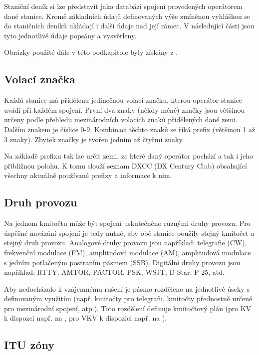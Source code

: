 Staniční deník si lze představit jako databázi spojení provedených operátorem dané stanice.
Kromě základních údajů definovaných výše zmíněnou vyhláškou se do staničních deníků ukládají i další údaje
nad její rámec. V následující části jsou tyto jednotlivé údaje popsány a vysvětleny.

Obrázky použité dále v této podkapitole byly získány z \cite{mapability}.

\subsection{Volací značka}

Každá stanice má přidělenu jedinečnou volací značku, kterou operátor stanice uvádí při každém spojení.
První dva znaky (někdy méně) značky jsou většinou určeny podle přehledu mezinárodních volacích znaků
přidělených dané zemi.
Dalším znakem je číslice 0-9. Kombinaci těchto znaků se říká prefix (většinou 1 až
3 znaky). Zbytek značky je tvořen jedním až čtyřmi znaky.

Na základě prefixu tak lze určit zemi, ze které daný operátor pochází a tak i
jeho přibližnou polohu. K tomu slouží seznam DXCC (DX Century Club) \cite{dxcc} %
obsahující všechny aktuálně používané prefixy a informace k nim.

\subsection{Druh provozu}

Na jednom kmitočtu může být spojení uskutečněno různými druhy provozu. Pro
úspěšné navázání spojení je tedy nutné, aby obě stanice použily stejný kmitočet
a stejný druh provozu. Analogové druhy provozu jsou například: telegrafie (CW), frekvenční modulace (FM), amplitudová modulace (AM),
amplitudová modulace s jedním potlačeným postraním pásmem (SSB). Digitální druhy provozu jsou například: RTTY, AMTOR, PACTOR, PSK, WSJT, D-Star, P-25, atd.

Aby nedocházalo k vzájemnému rušení je pásmo rozděleno na jednotlivé úseky s
definovaným využitím (např. kmitočty pro telegrafii, kmitočty přednostně určené
pro mezinárodní spojení, atp.). Toto rozdělení definuje kmitočtový plán (pro KV
k dispozci např. na \cite{plan_kv}, pro VKV k dispozici např. na
\cite{plan_kv}).

\subsection{ITU zóny}

